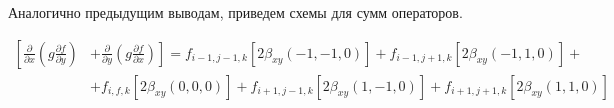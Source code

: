 Аналогично предыдущим выводам, приведем схемы для сумм
операторов.

\begin{equation*}
    \begin{split}
        \left[
            \frac
                {\partial}
                {\partial x}
            \left(
                g
                \frac
                    {\partial f}
                    {\partial y}
            \right)
        \right.
            &
        \left.
            +
            \frac
                {\partial}
                {\partial y}
            \left(
                g
                \frac
                    {\partial f}
                    {\partial x}
            \right)
        \right]
        =
        f_{i-1, j-1, k}
        \left[
            2
            \beta_{xy} \left(-1, -1, 0\right)
        \right]
        +
        f_{i-1, j+1, k}
        \left[
            2
            \beta_{xy} \left(-1, 1, 0\right)
        \right]
        +
        \\
        &
        +
        f_{i, f, k}
        \left[
            2
            \beta_{xy} \left(0, 0, 0\right)
        \right]
        +
        f_{i+1, j-1, k}
        \left[
            2
            \beta_{xy} \left(1, -1, 0\right)
        \right]
        +
        f_{i+1, j+1, k}
        \left[
            2
            \beta_{xy} \left(1, 1, 0\right)
        \right]
    \end{split}
\end{equation*}

